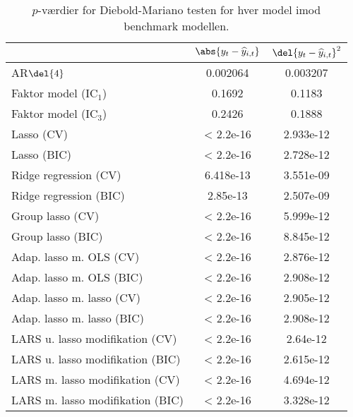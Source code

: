 \begin{table}[ht]
\center
\begin{tabular}{lcc}
\toprule
 & \(\abs{y_t - \widehat{y}_{i,t}}\) & \(\del{y_t - \widehat{y}_{i,t}}^2\) \\ \midrule
AR\(\del{4}\) & 0.002064 & 0.003207 \\  
Faktor model (IC\(_1\)) & 0.1692 & 0.1183 \\
Faktor model (IC\(_3\)) & 0.2426 & 0.1888 \\
Lasso (CV) & < 2.2e-16 & 2.933e-12 \\
Lasso (BIC) & < 2.2e-16 & 2.728e-12 \\
Ridge regression (CV) & 6.418e-13 & 3.551e-09  \\
Ridge regression (BIC) & 2.85e-13 & 2.507e-09 \\
Group lasso (CV) & < 2.2e-16 & 5.999e-12  \\
Group lasso (BIC) & < 2.2e-16 & 8.845e-12 \\
Adap. lasso m. OLS (CV) & < 2.2e-16 & 2.876e-12 \\
Adap. lasso m. OLS (BIC) & < 2.2e-16 & 2.908e-12 \\
Adap. lasso m. lasso (CV) & < 2.2e-16 & 2.905e-12  \\
Adap. lasso m. lasso (BIC) & < 2.2e-16 & 2.908e-12 \\
LARS u. lasso modifikation (CV) & < 2.2e-16 & 2.64e-12  \\
LARS u. lasso modifikation (BIC) & < 2.2e-16 & 2.615e-12 \\
LARS m. lasso modifikation (CV) & < 2.2e-16 & 4.694e-12  \\
LARS m. lasso modifikation (BIC) & < 2.2e-16 & 3.328e-12 \\ \bottomrule
\end{tabular}
\caption{\(p\)-værdier for Diebold-Mariano testen for hver model imod benchmark modellen.} \label{tab:dm_test}
\end{table}
